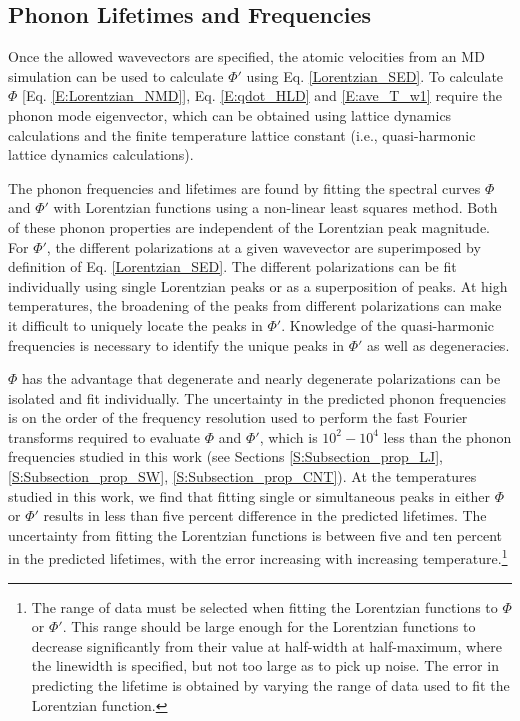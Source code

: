 \documentclass[12pt,twocolumn,iop]{/usr/share/texmf-texlive/tex/latex/iop/iopart}[/usr/share/texmf-texlive/tex/latex/iop/]
\begin{document}
\subsection{\label{Subsection_Comp_Details_2}Phonon Lifetimes and Frequencies}

Once the allowed wavevectors are specified, the atomic velocities from an MD simulation can be used to calculate $\Phi'$ using Eq$.$ \eqref{Lorentzian_SED}. To calculate $\Phi$ [Eq$.$ \eqref{E:Lorentzian_NMD}], Eq$.$ \eqref{E:qdot_HLD} and \eqref{E:ave_T_w1} require the phonon mode eigenvector, which can be obtained using lattice dynamics calculations and the finite temperature lattice constant (i.e., quasi-harmonic lattice dynamics calculations).\cite{dove1993}

The phonon frequencies and lifetimes are found by fitting the spectral curves $\Phi$ and $\Phi'$ with Lorentzian functions using a non-linear least squares method. Both of these phonon properties are independent of the Lorentzian peak magnitude. For $\Phi'$, the different polarizations at a given wavevector are superimposed by definition of Eq$.$ \eqref{Lorentzian_SED}. The different polarizations can be fit individually using single Lorentzian peaks or as a superposition of peaks. At high temperatures, the broadening of the peaks from different polarizations can make it difficult to uniquely locate the peaks in $\Phi'$. Knowledge of the quasi-harmonic frequencies is necessary to identify the unique peaks in $\Phi'$ as well as degeneracies.\cite{mcgaughey2006b,turney2009a}

$\Phi$ has the advantage that degenerate and nearly degenerate polarizations can be isolated and fit individually. The uncertainty in the predicted phonon frequencies is on the order of the frequency resolution used to perform the fast Fourier transforms required to evaluate $\Phi$ and $\Phi'$, which is $10^2-10^4$ less than the phonon frequencies studied in this work (see Sections \ref{S:Subsection_prop_LJ}, \ref{S:Subsection_prop_SW}, \ref{S:Subsection_prop_CNT}). At the temperatures studied in this work, we find that fitting single or simultaneous peaks in either $\Phi$ or $\Phi'$ results in less than five percent difference in the predicted lifetimes. The uncertainty from fitting the Lorentzian functions is between five and ten percent in the predicted lifetimes, with the error increasing with increasing temperature.\footnote[1]{The range of data must be selected when fitting the Lorentzian functions to $\Phi$ or $\Phi'$. This range should be large enough for the Lorentzian functions to decrease significantly from their value at
half-width at half-maximum, where the linewidth is specified, but not too large as to pick up noise. The error in predicting the lifetime is obtained by varying the range of data
used to fit the Lorentzian function.}
\end{document}
